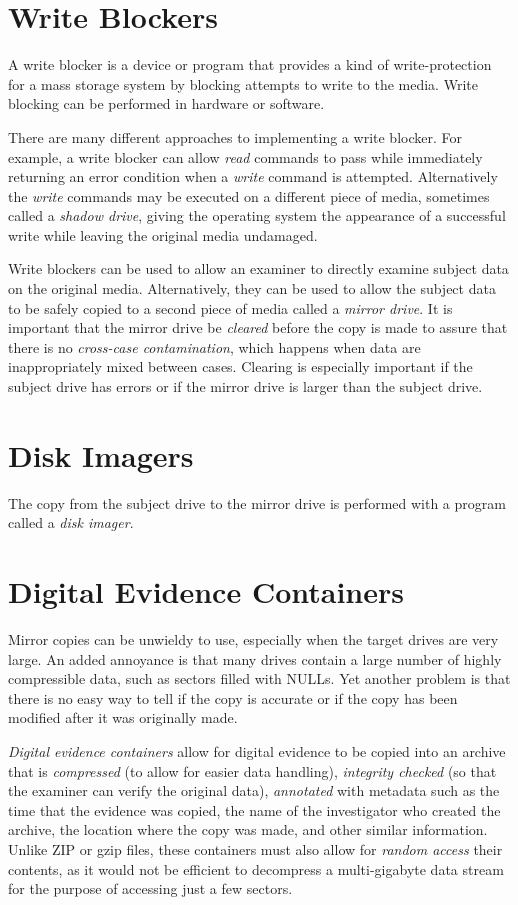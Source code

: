 \documentclass[11pt,letter]{article}
\begin{document}
\section{Write Blockers}

A write blocker is a device or program that provides a kind of
write-protection for a mass storage system by blocking attempts to
write to the media. Write blocking can be performed in hardware or
software. 

There are many different approaches to implementing a write
blocker. For example, a write blocker can allow \emph{read} commands
to pass while immediately returning an error condition when a
\emph{write} command is attempted. Alternatively the \emph{write}
commands may be executed on a different piece of media, sometimes
called a \emph{shadow drive}, giving the operating system the
appearance of a successful write while leaving the original media
undamaged.

Write blockers can be used to allow an examiner to directly examine
subject data on the original media. Alternatively, they can be used to allow the subject
data to be safely copied to a second piece of media called a
\emph{mirror drive}. It is important that the mirror drive be
\emph{cleared} before the copy is made to assure that there is no
\emph{cross-case contamination}, which happens when data are
inappropriately mixed between cases. Clearing is especially important
if the subject drive has errors or if the mirror drive is larger than
the subject drive.

\section{Disk Imagers}
The copy from the subject drive to the mirror drive is performed with
a program called a \emph{disk imager}.

\section{Digital Evidence Containers}

Mirror copies can be unwieldy to use, especially when the target
drives are very large. An added annoyance is that many drives contain
a large number of highly compressible data, such as sectors filled
with NULLs. Yet another problem is that there is no easy way to tell
if the copy is accurate or if the copy has been modified after it was
originally made.

\emph{Digital evidence containers} allow for digital evidence to be
copied into an archive that is \emph{compressed} (to allow for easier
data handling), \emph{integrity checked} (so that the examiner can
verify the original data), \emph{annotated} with metadata such as the
time that the evidence was copied, the name of the investigator who
created the archive, the location where the copy was made, and other
similar information. Unlike ZIP or gzip files, these containers must
also allow for \emph{random access} their contents, as it would not be
efficient to decompress a multi-gigabyte data stream for the purpose
of accessing just a few sectors.
\end{document}
